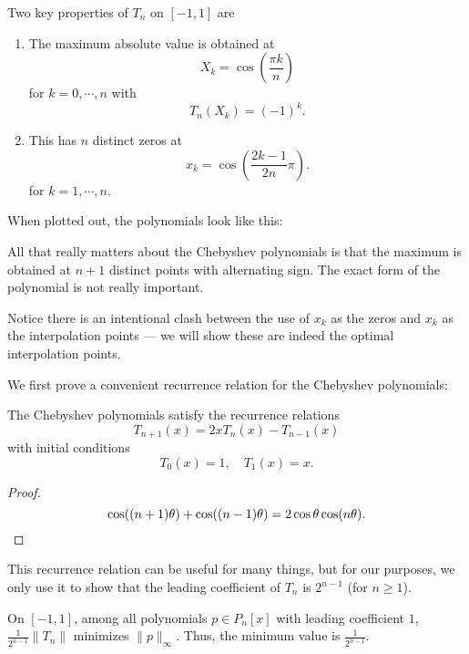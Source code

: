 \documentclass[a4paper]{article}
\begin{document}
Two key properties of $T_n$ on $[-1, 1]$ are
\begin{enumerate}
  \item The maximum absolute value is obtained at
    \[
      X_k = \cos\left(\frac{\pi k}{n}\right)
    \]
    for $k = 0, \cdots, n$ with
    \[
      T_n(X_k) = (-1)^k.
    \]
  \item This has $n$ distinct zeros at
    \[
      x_k = \cos\left(\frac{2k - 1}{2n}\pi\right).
    \]
    for $k = 1, \cdots, n$.
\end{enumerate}
When plotted out, the polynomials look like this:
\begin{center}
\end{center}
All that really matters about the Chebyshev polynomials is that the maximum is obtained at $n + 1$ distinct points with alternating sign. The exact form of the polynomial is not really important.

Notice there is an intentional clash between the use of $x_k$ as the zeros and $x_k$ as the interpolation points --- we will show these are indeed the optimal interpolation points.

We first prove a convenient recurrence relation for the Chebyshev polynomials:
\begin{lemma}
  The Chebyshev polynomials satisfy the recurrence relations
  \[
    T_{n + 1}(x) = 2x T_n(x) - T_{n - 1}(x)
  \]
  with initial conditions
  \[
    T_0(x) = 1,\quad T_1(x) = x.
  \]
\end{lemma}

\begin{proof}
  \[
    \cos((n + 1) \theta) + \cos((n - 1)\theta) = 2\cos \theta \cos(n\theta).\qedhere
  \]
\end{proof}
This recurrence relation can be useful for many things, but for our purposes, we only use it to show that the leading coefficient of $T_n$ is $2^{n - 1}$ (for $n \geq 1$).

\begin{thm}
  On $[-1, 1]$, among all polynomials $p \in P_n[x]$ with leading coefficient $1$, $\frac{1}{2^{n - 1}} \|T_n\|$ minimizes $\|p\|_{\infty}$. Thus, the minimum value is $\frac{1}{2^{n - 1}}$.
\end{thm}
\end{document}
